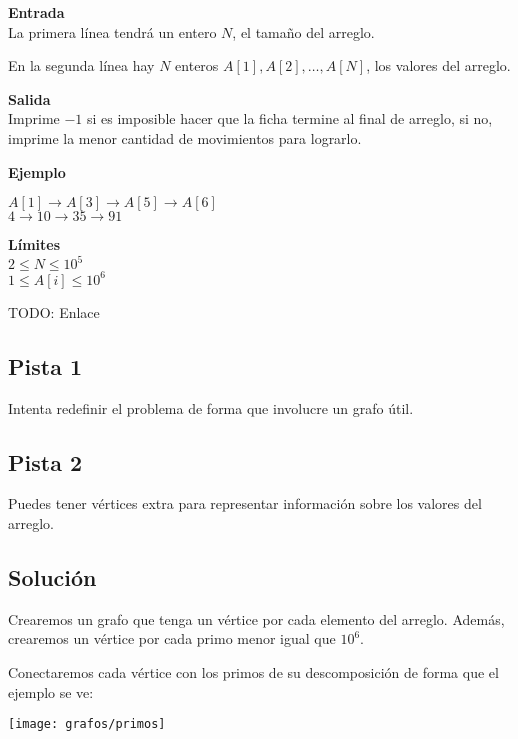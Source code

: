 \textbf{Entrada}\\
La primera línea tendrá un entero \(N\), el tamaño del arreglo.

En la segunda línea hay \(N\) enteros \(A[1], A[2], \ldots, A[N]\), los valores del arreglo.

\textbf{Salida}\\
Imprime \(-1\) si es imposible hacer que la ficha termine al final de arreglo, si no, imprime la menor cantidad de movimientos para lograrlo.

\textbf{Ejemplo}\\
\begin{casebox3}
	 {
		\(A[1]\rightarrow A[3]\rightarrow A[5]\rightarrow A[6]\) \\
		\(4\rightarrow 10\rightarrow 35\rightarrow 91\)
	}
	 {	}
	 {	}
\end{casebox3}

\textbf{Límites}\\
\(2\leq N\leq10^5\)\\
\(1\leq A[i]\leq10^6\)


TODO: Enlace

\pagebreak

\subsection*{Pista 1}
Intenta redefinir el problema de forma que involucre un grafo útil.

\subsection*{Pista 2}
Puedes tener vértices extra para representar información sobre los valores del arreglo.

\subsection*{Solución}
Crearemos un grafo que tenga un vértice por cada elemento del arreglo. Además, crearemos un vértice por cada primo menor igual que \(10^6\).

Conectaremos cada vértice con los primos de su descomposición de forma que el ejemplo se ve:

\begin{center}
	\texttt{[image: grafos/primos]}
\end{center}

